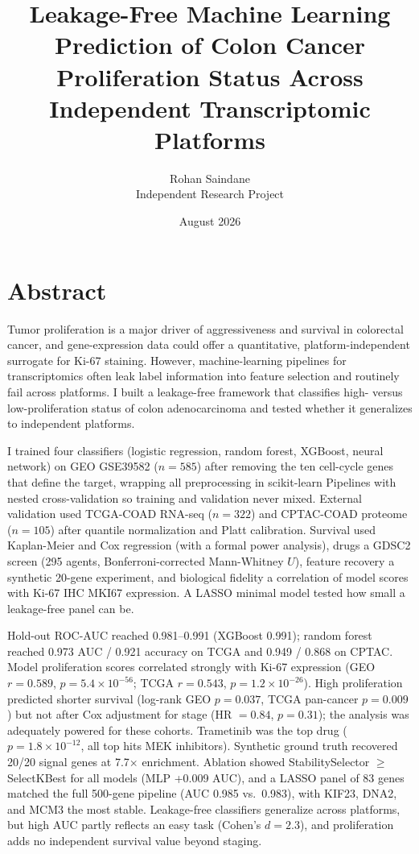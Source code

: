 \documentclass[12pt]{article}
\title{\textbf{Leakage-Free Machine Learning Prediction of Colon Cancer Proliferation Status Across Independent Transcriptomic Platforms}}
\author{Rohan Saindane\\Independent Research Project}
\date{August 2026}
\begin{document}
\maketitle

\section*{Abstract}

Tumor proliferation is a major driver of aggressiveness and survival in colorectal cancer, and gene-expression data could offer a quantitative, platform-independent surrogate for Ki-67 staining. However, machine-learning pipelines for transcriptomics often leak label information into feature selection and routinely fail across platforms. I built a leakage-free framework that classifies high- versus low-proliferation status of colon adenocarcinoma and tested whether it generalizes to independent platforms.

I trained four classifiers (logistic regression, random forest, XGBoost, neural network) on GEO GSE39582 ($n = 585$) after removing the ten cell-cycle genes that define the target, wrapping all preprocessing in scikit-learn Pipelines with nested cross-validation so training and validation never mixed. External validation used TCGA-COAD RNA-seq ($n = 322$) and CPTAC-COAD proteome ($n = 105$) after quantile normalization and Platt calibration. Survival used Kaplan-Meier and Cox regression (with a formal power analysis), drugs a GDSC2 screen (295 agents, Bonferroni-corrected Mann-Whitney $U$), feature recovery a synthetic 20-gene experiment, and biological fidelity a correlation of model scores with Ki-67 IHC MKI67 expression. A LASSO minimal model tested how small a leakage-free panel can be.

Hold-out ROC-AUC reached 0.981--0.991 (XGBoost 0.991); random forest reached 0.973 AUC / 0.921 accuracy on TCGA and 0.949 / 0.868 on CPTAC. Model proliferation scores correlated strongly with Ki-67 expression (GEO $r = 0.589$, $p = 5.4 \times 10^{-56}$; TCGA $r = 0.543$, $p = 1.2 \times 10^{-26}$). High proliferation predicted shorter survival (log-rank GEO $p = 0.037$, TCGA pan-cancer $p = 0.009$) but not after Cox adjustment for stage (HR $= 0.84$, $p = 0.31$); the analysis was adequately powered for these cohorts. Trametinib was the top drug ($p = 1.8\times 10^{-12}$, all top hits MEK inhibitors). Synthetic ground truth recovered 20/20 signal genes at 7.7$\times$ enrichment. Ablation showed StabilitySelector $\geq$ SelectKBest for all models (MLP +0.009 AUC), and a LASSO panel of 83 genes matched the full 500-gene pipeline (AUC 0.985 vs.\ 0.983), with KIF23, DNA2, and MCM3 the most stable. Leakage-free classifiers generalize across platforms, but high AUC partly reflects an easy task (Cohen's $d = 2.3$), and proliferation adds no independent survival value beyond staging.
\end{document}

